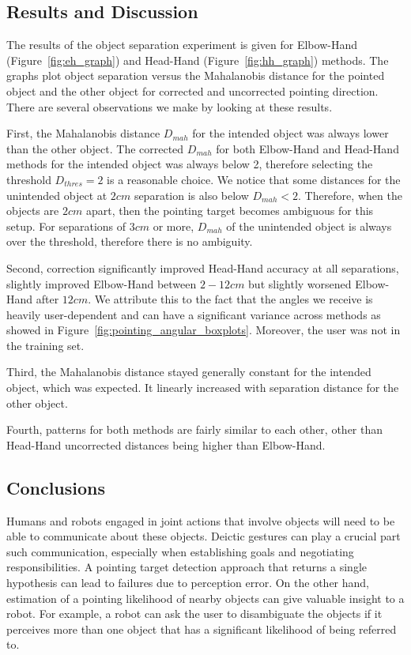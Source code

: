 \documentclass[12pt]{gatech-thesis}
\begin{document}
\subsection{Results and Discussion}
\label{sec:results_and_discussion}

The results of the object separation experiment is given for Elbow-Hand (Figure~\ref{fig:eh_graph}) and Head-Hand (Figure~\ref{fig:hh_graph}) methods. The graphs plot object separation versus the Mahalanobis distance for the pointed object and the other object for corrected and uncorrected pointing direction. There are several observations we make by looking at these results.

First, the Mahalanobis distance $D_{mah}$ for the intended object was always lower than the other object. The corrected $D_{mah}$ for both Elbow-Hand and Head-Hand methods for the intended object was always below 2, therefore selecting the threshold $D_{thres}=2$ is a reasonable choice. We notice that some distances for the unintended object at $2cm$ separation is also below $D_{mah}<2$. Therefore, when the objects are $2 cm$ apart, then the pointing target becomes ambiguous for this setup. For separations of $3cm$ or more, $D_{mah}$ of the unintended object is always over the threshold, therefore there is no ambiguity.

Second, correction significantly improved Head-Hand accuracy at all separations, slightly improved Elbow-Hand between $2-12cm$ but slightly worsened Elbow-Hand after $12cm$. We attribute this to the fact that the angles we receive is heavily user-dependent and can have a significant variance across methods as showed in Figure~\ref{fig:pointing_angular_boxplots}. Moreover, the user was not in the training set.

Third, the Mahalanobis distance stayed generally constant for the intended object, which was expected. It linearly increased with separation distance for the other object.

Fourth, patterns for both methods are fairly similar to each other, other than Head-Hand uncorrected distances being higher than Elbow-Hand.

\subsection{Conclusions}
\label{sec:pointing_conclusions}

Humans and robots engaged in joint actions that involve objects will need to be able to communicate about these objects. Deictic gestures can play a crucial part such communication, especially when establishing goals and negotiating responsibilities. A pointing target detection approach that returns a single hypothesis can lead to failures due to perception error. On the other hand, estimation of a pointing likelihood of nearby objects can give valuable insight to a robot. For example, a robot can ask the user to disambiguate the objects if it perceives more than one object that has a significant likelihood of being referred to.
\end{document}
